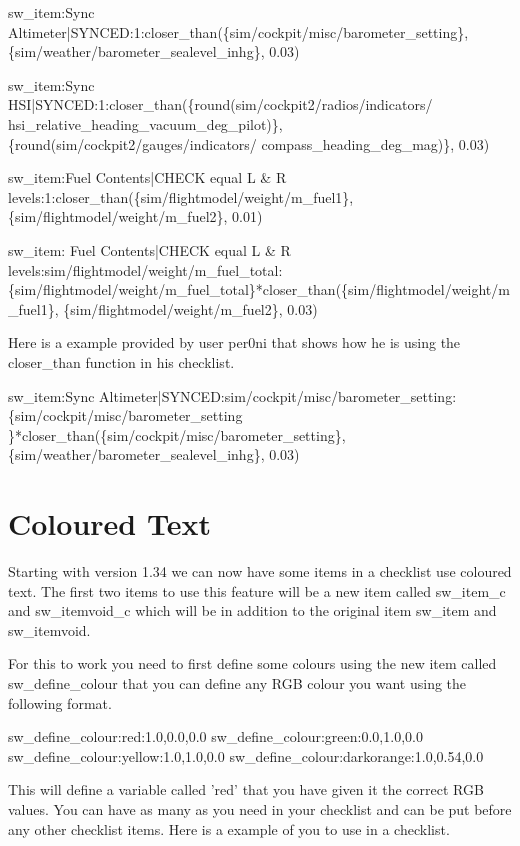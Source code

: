 \documentclass[11pt,parskip=half,a4paper]{scrartcl}
\begin{document}
sw\_item:Sync Altimeter|SYNCED:1:closer\_than(\{sim/cockpit/misc/barometer\_setting\}, \{sim/weather/barometer\_sealevel\_inhg\}, 0.03)

sw\_item:Sync HSI|SYNCED:1:closer\_than(\{round(sim/cockpit2/radios/indicators/\newline
hsi\_relative\_heading\_vacuum\_deg\_pilot)\}, \{round(sim/cockpit2/gauges/indicators/\newline
compass\_heading\_deg\_mag)\}, 0.03)

sw\_item:Fuel Contents|CHECK equal L \& R levels:1:closer\_than(\{sim/flightmodel/weight/m\_fuel1\}, \{sim/flightmodel/weight/m\_fuel2\}, 0.01)

sw\_item: Fuel Contents|CHECK equal L \& R levels:sim/flightmodel/weight/m\_fuel\_total:\newline
\{sim/flightmodel/weight/m\_fuel\_total\}*closer\_than(\{sim/flightmodel/weight/m\_fuel1\}, 
\{sim/flightmodel/weight/m\_fuel2\}, 0.03)\newline


Here is a example provided by user per0ni that shows how he is using the closer\_than function in his checklist.

sw\_item:Sync Altimeter|SYNCED:sim/cockpit/misc/barometer\_setting:\{sim/cockpit/misc/barometer\_setting
\}*closer\_than(\{sim/cockpit/misc/barometer\_setting\}, \{sim/weather/barometer\_sealevel\_inhg\}, 0.03)


\newpage
\section{Coloured Text}

Starting with version 1.34 we can now have some items in a checklist use coloured text. The first two items to use this feature will be a new item called sw\_item\_c and sw\_itemvoid\_c which will be in addition to the original item sw\_item and sw\_itemvoid.

For this to work you need to first define some colours using the new item called sw\_define\_colour that you can define any RGB colour you want using the following format.

sw\_define\_colour:red:1.0,0.0,0.0 \newline
sw\_define\_colour:green:0.0,1.0,0.0 \newline
sw\_define\_colour:yellow:1.0,1.0,0.0 \newline
sw\_define\_colour:darkorange:1.0,0.54,0.0

This will define a variable called 'red' that you have given it the correct RGB values. You can have as many as you need in your checklist and can be put before any other checklist items. Here is a example of you to use in a checklist.
\end{document}
